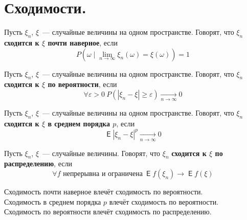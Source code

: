 \documentclass{article}
\DeclareMathOperator{\Expected}{\mathsf{E}}
\begin{document}
    \section{Сходимости.}
    \begin{definition}
        Пусть $\xi_n$, $\xi$~--- случайные величины на одном пространстве. Говорят, что $\xi_n$ \textbf{сходится к $\xi$ почти наверное}, если
        $$
        P({\omega\mid \lim\limits_{n\to\infty}\xi_n(\omega)=\xi(\omega)})=1
        $$
    \end{definition}
    \begin{definition}
        Пусть $\xi_n$, $\xi$~--- случайные величины на одном пространстве. Говорят, что $\xi_n$ \textbf{сходится к $\xi$ по вероятности}, если
        $$
        \forall\varepsilon>0~P(|\xi_n-\xi|\geqslant\varepsilon)\underset{n\to\infty}\longrightarrow0
        $$
    \end{definition}
    \begin{definition}
        Пусть $\xi_n$, $\xi$~--- случайные величины на одном пространстве. Говорят, что $\xi_n$ \textbf{сходится к $\xi$ в среднем порядка $p$}, если
        $$
        \Expected|\xi_n-\xi|^p\underset{n\to\infty}\longrightarrow0
        $$
    \end{definition}
    \begin{definition}
        Пусть $\xi_n$, $\xi$~--- случайные величины. Говорят, что $\xi_n$ \textbf{сходится к $\xi$ по распределению}, если
        $$
        \forall f\text{ непрерывна и ограничена}~\Expected f(\xi_n)\rightarrow \Expected f(\xi)
        $$
    \end{definition}
    \begin{theorem}
        Сходимость почти наверное влечёт сходимость по вероятности.\\
        Сходимость в среднем порядка $p$ влечёт сходимость по вероятности.\\
        Сходимость по вероятности влечёт сходимость по распределению.\\
    \end{theorem}
\end{document}
